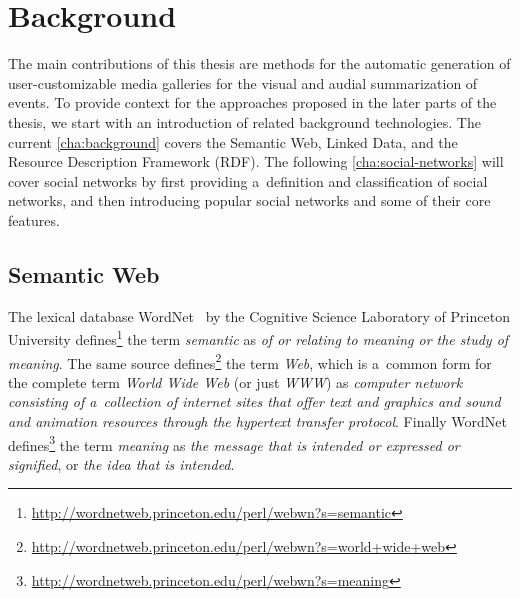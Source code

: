 

\chapter{Background} \label{cha:background}

\ifpdf
    \graphicspath{{2_background/figures/PNG/}{2_background/figures/PDF/}{2_background/figures/}}
\else
    \graphicspath{{2_background/figures/EPS/}{2_background/figures/}}
\fi


The main contributions of this thesis are methods for the automatic generation of
user-customizable media galleries for the visual and audial summarization of events.
To provide context for the approaches proposed in the later parts of the thesis,
we start with an introduction of related background technologies.
The current \autoref{cha:background} covers the Semantic Web, Linked Data,
and the Resource Description Framework (RDF).
The following \autoref{cha:social-networks} will cover social networks
by first providing a~definition and classification of social networks,
and then introducing popular social networks and some of their core features.

\section{Semantic Web}
The lexical database WordNet~\cite{Fellbaum1998} by the Cognitive Science Laboratory
of Princeton University defines\footnote{\url{http://wordnetweb.princeton.edu/perl/webwn?s=semantic}}
the term \emph{semantic} as \emph{of or relating to meaning or the study of meaning}.
The same source defines\footnote{\url{http://wordnetweb.princeton.edu/perl/webwn?s=world+wide+web}}
the term \emph{Web}, which is a~common form for the complete term \emph{World Wide Web} (or just \emph{WWW}) as
\emph{computer network consisting of a~collection of internet sites that offer text and graphics and
sound and animation resources through the hypertext transfer protocol}.
Finally WordNet defines\footnote{\url{http://wordnetweb.princeton.edu/perl/webwn?s=meaning}}
the term \emph{meaning} as \emph{the message that is intended or expressed or signified}, or
\emph{the idea that is intended}.

